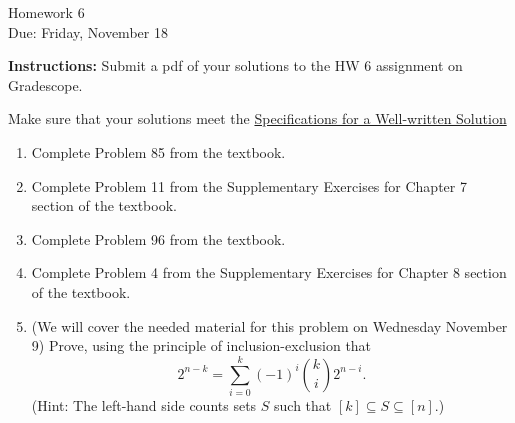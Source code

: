 \documentclass[12pt]{article}
\begin{document}
\begin{center}
{\Large Homework 6}\\
Due: Friday, November 18\\


\end{center}
{\bf Instructions:} Submit a pdf of your solutions to the HW 6 assignment on Gradescope. 

Make sure that your solutions meet the \href{https://docs.google.com/document/d/18LfQoqi6BsY2VdAlpC5xdYEA2rxSGoH0891nVec4_Os/edit?usp=sharing}{Specifications for a Well-written Solution} 

\begin{enumerate}
\item Complete Problem 85 from the textbook.
\item Complete Problem 11 from the Supplementary Exercises for Chapter 7 section of the textbook. 
\item Complete Problem 96 from the textbook.
\item Complete Problem 4 from the Supplementary Exercises for Chapter 8 section of the textbook.
\item (We will cover the needed material for this problem on Wednesday November 9) Prove, using the principle of inclusion-exclusion that $$2^{n-k}=\sum_{i=0}^k(-1)^i{k\choose i}2^{n-i}.$$
(Hint: The left-hand side counts sets $S$ such that $[k]\subseteq S \subseteq [n]$.)
\end{enumerate}
\end{document}
